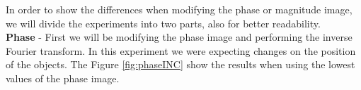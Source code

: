 \documentclass[12pt,a4paper]{article}
\begin{document}
In order to show the differences when modifying the phase or magnitude image, we will divide the experiments into two parts, also for better readability. \\


\textbf{Phase} - First we will be modifying the phase image and performing the inverse Fourier transform. In this experiment we were expecting changes on the position of the objects. The Figure \ref{fig:phaseINC} show the results when using the lowest values of the phase image. \\

\begin{figure}[!h]
	\centering
	\quad
	\quad

\end{figure}
\end{document}
